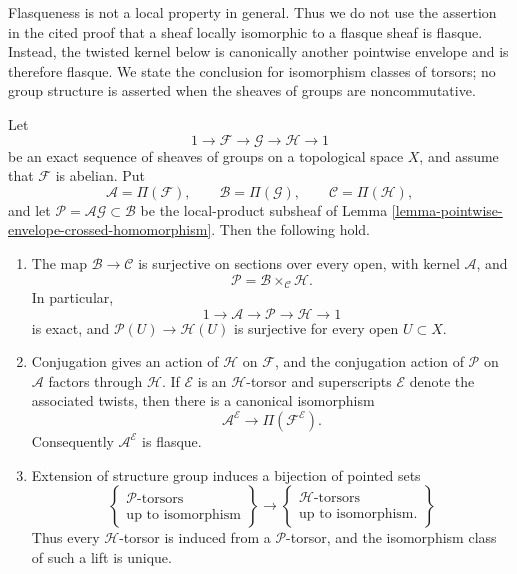 \begin{lemma}
\label{lemma-pointwise-envelope-torsor-bijection}
\begin{reference}
\cite[Chapter III, \S 3.4, proof of Proposition 3.4.2,
pp. 162--163]{Tohoku}
\end{reference}
\begin{history}
Flasqueness is not a local property in general. Thus we do not use the
assertion in the cited proof that a sheaf locally isomorphic to a flasque
sheaf is flasque. Instead, the twisted kernel below is canonically another
pointwise envelope and is therefore flasque. We state the conclusion for
isomorphism classes of torsors; no group structure is asserted when the
sheaves of groups are noncommutative.
\end{history}
Let
$$
1\longrightarrow\mathcal F\longrightarrow\mathcal G
\longrightarrow\mathcal H\longrightarrow 1
$$
be an exact sequence of sheaves of groups on a topological space $X$, and
assume that $\mathcal F$ is abelian. Put
$$
\mathcal A=\Pi(\mathcal F),\qquad
\mathcal B=\Pi(\mathcal G),\qquad
\mathcal C=\Pi(\mathcal H),
$$
and let $\mathcal P=\mathcal A\mathcal G\subset\mathcal B$ be the
local-product subsheaf of
Lemma \ref{lemma-pointwise-envelope-crossed-homomorphism}. Then the
following hold.
\begin{enumerate}
\item The map $\mathcal B\to\mathcal C$ is surjective on sections over
every open, with kernel $\mathcal A$, and
$$
\mathcal P=\mathcal B\times_{\mathcal C}\mathcal H.
$$
In particular,
$$
1\longrightarrow\mathcal A\longrightarrow\mathcal P
\longrightarrow\mathcal H\longrightarrow 1
$$
is exact, and $\mathcal P(U)\to\mathcal H(U)$ is surjective for every
open $U\subset X$.
\item Conjugation gives an action of $\mathcal H$ on $\mathcal F$, and
the conjugation action of $\mathcal P$ on $\mathcal A$ factors through
$\mathcal H$. If $\mathcal E$ is an $\mathcal H$-torsor and superscripts
$\mathcal E$ denote the associated twists, then there is a canonical
isomorphism
$$
\mathcal A^{\mathcal E}\longrightarrow
\Pi(\mathcal F^{\mathcal E}).
$$
Consequently $\mathcal A^{\mathcal E}$ is flasque.
\item Extension of structure group induces a bijection of pointed sets
$$
\left\{
\begin{matrix}
\mathcal P\text{-torsors}\\
\text{up to isomorphism}
\end{matrix}
\right\}
\longrightarrow
\left\{
\begin{matrix}
\mathcal H\text{-torsors}\\
\text{up to isomorphism}.
\end{matrix}
\right\}
$$
Thus every $\mathcal H$-torsor is induced from a $\mathcal P$-torsor,
and the isomorphism class of such a lift is unique.
\end{enumerate}
\end{lemma}

